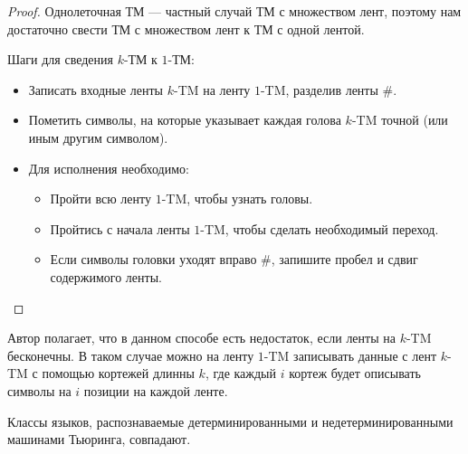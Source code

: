     \begin{proof}
        \par Однолеточная ТМ --- частный случай ТМ с множеством лент, поэтому нам достаточно свести ТМ с множеством лент к ТМ с одной лентой.
        \par Шаги для сведения $k$-ТМ к $1$-ТМ:
        \begin{itemize}
            \item Записать входные ленты $k$-TM на ленту $1$-TM, разделив ленты \#.
            \item Пометить символы, на которые указывает каждая голова $k$-TM точной (или иным другим символом).
            \item Для исполнения необходимо:
                \begin{itemize}
                    \item Пройти всю ленту $1$-TM, чтобы узнать головы.
                    \item Пройтись с начала ленты $1$-TM, чтобы сделать необходимый переход.
                    \item Если символы головки уходят вправо \#, запишите пробел и сдвиг содержимого ленты.
                \end{itemize}
        \end{itemize}
    \end{proof}

        
    \begin{Rem}
        Автор полагает, что в данном способе есть недостаток, если ленты на $k$-TM бесконечны. В таком случае можно на ленту $1$-TM записывать данные с лент $k$-TM с помощью кортежей длинны $k$, где каждый $i$ кортеж будет описывать символы на $i$ позиции на каждой ленте.
    \end{Rem}
    
    \begin{Thm}
    Классы языков, распознаваемые детерминированными и недетерминированными машинами Тьюринга, совпадают.
    \end{Thm}
    
